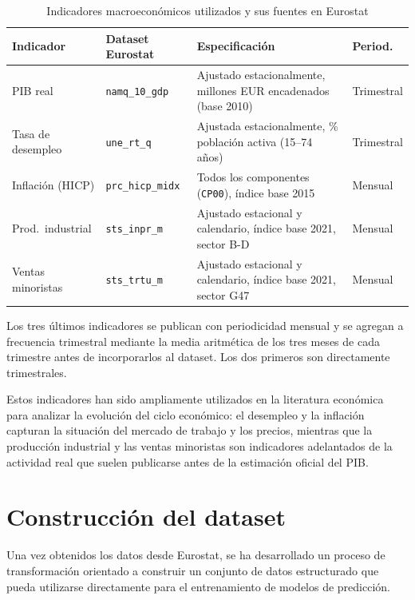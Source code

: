 \begin{table}[H]
\centering
\caption{Indicadores macroeconómicos utilizados y sus fuentes en Eurostat}
\label{tab:fuentes}
\small
\begin{tabular}{p{2.8cm} p{3cm} p{6.5cm} p{1.8cm}}
\hline
\textbf{Indicador} & \textbf{Dataset Eurostat} & \textbf{Especificación} & \textbf{Period.} \\
\hline
PIB real              & \texttt{namq\_10\_gdp}   & Ajustado estacionalmente, millones EUR encadenados (base 2010) & Trimestral \\[4pt]
Tasa de desempleo     & \texttt{une\_rt\_q}      & Ajustada estacionalmente, \% población activa (15--74 años)    & Trimestral \\[4pt]
Inflación (HICP)      & \texttt{prc\_hicp\_midx} & Todos los componentes (\texttt{CP00}), índice base 2015        & Mensual    \\[4pt]
Prod.\ industrial     & \texttt{sts\_inpr\_m}    & Ajustado estacional y calendario, índice base 2021, sector B-D & Mensual    \\[4pt]
Ventas minoristas     & \texttt{sts\_trtu\_m}    & Ajustado estacional y calendario, índice base 2021, sector G47 & Mensual    \\
\hline
\end{tabular}
\end{table}

Los tres últimos indicadores se publican con periodicidad mensual y se agregan a frecuencia trimestral mediante la media aritmética de los tres meses de cada trimestre antes de incorporarlos al dataset. Los dos primeros son directamente trimestrales.

Estos indicadores han sido ampliamente utilizados en la literatura económica para analizar la evolución del ciclo económico: el desempleo y la inflación capturan la situación del mercado de trabajo y los precios, mientras que la producción industrial y las ventas minoristas son indicadores adelantados de la actividad real que suelen publicarse antes de la estimación oficial del PIB.

\section{Construcción del dataset}

Una vez obtenidos los datos desde Eurostat, se ha desarrollado un proceso de transformación orientado a construir un conjunto de datos estructurado que pueda utilizarse directamente para el entrenamiento de modelos de predicción.

